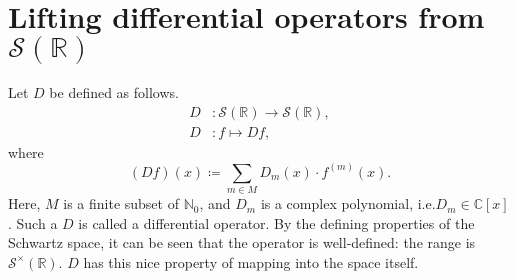 \documentclass[12pt, a4 paper]{article}
\theoremstyle{definition}
\newcommand{\rr}{\mathbb{R}}
\newcommand{\cc}{\mathbb{C}}
\newcommand{\nn}{\mathbb{N}_0}
\newcommand{\schwartz}{\mathcal{S}}
\newcommand{\schwartzr}{\schwartz(\rr)}
\newcommand{\dist}{\schwartz^\times}
\newcommand{\distr}{\dist(\rr)}
\newcommand{\distar}{\schwartz^*(\rr)}
\newcommand{\slantbox}[2][.5]
{%
	\mbox
	{%
		\sbox{\foobox}{#2}%
		\hskip\wd\foobox
		\pdfsave
		\pdfsetmatrix{1 0 #1 1}%
		\llap{\usebox{\foobox}}%
		\pdfrestore
	}%
}
\begin{document}

	\section{Lifting differential operators from \texorpdfstring{\(\schwartzr\)}{𝒮(ℝ)}}

	Let $D$ be defined as follows.
	\begin{align*}
		D &\colon \schwartzr \rightarrow \schwartzr,\\
		D &\colon f \mapsto Df,
	\end{align*}
	where
	\[
	(Df)(x) \coloneq \sum_{m \in M} D_m(x) \cdot f^{(m)} (x).
	\]
	Here, $M$ is a finite subset of $\nn$, and $D_m$ is a complex polynomial, i.e.\@ $D_m \in \cc[x]$. Such a $D$ is called a differential operator. By the defining properties of the Schwartz space, it can be seen that the operator is well-defined: the range is $\distr$. $D$ has this nice property of mapping into the space itself.
\end{document}
